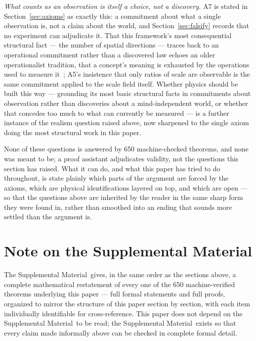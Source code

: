 \documentclass[aps,prd,twocolumn,superscriptaddress,nofootinbib]{revtex4-2}
\newcommand{\SM}{Supplemental Material}
\begin{document}
\emph{What counts as an observation is itself a choice, not a
discovery.} A7 is stated in Section~\ref{sec:axioms} as exactly this: a
commitment about what a single observation is, not a claim about the
world, and Section~\ref{sec:falsify} records that no experiment can
adjudicate it. That this framework's most consequential structural fact
— the number of spatial directions — traces back to an operational
commitment rather than a discovered law echoes an older operationalist
tradition, that a concept's meaning is exhausted by the operations used
to measure it~\cite{Bridgman1927}; A5's insistence that only ratios of
scale are observable is the same commitment applied to the scale field
itself. Whether physics should be built this way — grounding its most
basic structural facts in commitments about observation rather than
discoveries about a mind-independent world, or whether that concedes too
much to what can currently be measured — is a further instance of the
realism question raised above, now sharpened to the single axiom doing
the most structural work in this paper.

None of these questions is answered by 650 machine-checked theorems, and
none was meant to be; a proof assistant adjudicates validity, not the
questions this section has raised. What it can do, and what this paper
has tried to do throughout, is state plainly which parts of the argument
are forced by the axioms, which are physical identifications layered on
top, and which are open — so that the questions above are inherited by
the reader in the same sharp form they were found in, rather than
smoothed into an ending that sounds more settled than the argument is.

\onecolumngrid
\appendix
\section{Note on the Supplemental Material}
The \SM\ gives, in the same order as the sections above, a complete
mathematical restatement of every one of the 650 machine-verified
theorems underlying this paper — full formal statements and full proofs,
organized to mirror the structure of this paper section by section, with
each item individually identifiable for cross-reference. This paper does
not depend on the \SM\ to be read; the \SM\ exists so that every claim
made informally above can be checked in complete formal detail.


\end{document}
